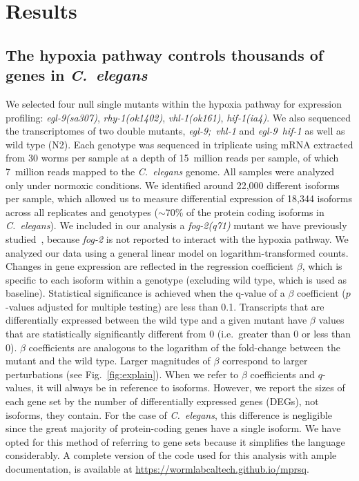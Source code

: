 \documentclass[9pt,twocolumn,twoside]{pnas-new}
\newcommand{\cel}{\emph{C.~elegans}}
\newcommand{\gene}[1]{\mbox{\emph{#1}}}
\begin{document}
\section*{Results}
\subsection*{The hypoxia pathway controls thousands of genes in \cel{}}
\label{sub:summary}

We selected four null single mutants within the hypoxia pathway for expression
profiling: \gene{egl-9(sa307)}, \gene{rhy-1(ok1402)}, \gene{vhl-1(ok161)},
\gene{hif-1(ia4)}. We also sequenced the transcriptomes of two double mutants,
\gene{egl-9; vhl-1} and \gene{egl-9 hif-1} as well as wild type (N2).
\color{purple}
Each genotype was sequenced in triplicate using mRNA extracted from 30 worms per
sample at a depth of 15~million reads per
sample, of which 7~million reads mapped to the \cel{} genome.
All samples were analyzed only under normoxic conditions.
\color{black}
We identified around
22,000 different isoforms per sample, which allowed us to measure differential
expression of 18,344 isoforms across all replicates and genotypes ($\sim$70\% of
the protein coding isoforms in \cel{}). We included in our analysis a
\gene{fog-2(q71)} mutant we have previously studied~\cite{Angeles-Albores2017a},
because \gene{fog-2} is not reported to interact with the hypoxia pathway. We
analyzed our data using a general linear model on logarithm-transformed counts.
Changes in gene expression are reflected in the regression coefficient $\beta$,
which is specific to each isoform within a genotype (excluding wild type, which
is used as baseline). Statistical significance is achieved when the q-value of a
$\beta$ coefficient ($p$-values adjusted for multiple testing) are less than 0.1.
Transcripts that are differentially expressed between the wild type and a
given mutant have $\beta$ values that are statistically significantly different
from 0 (i.e.\ greater than 0 or less than 0). $\beta$ coefficients are analogous
to the logarithm of the fold-change between the mutant and the wild type. Larger
magnitudes of $\beta$ correspond to larger perturbations (see
Fig.~\ref{fig:explain}). When we refer to $\beta$ coefficients and $q$-values,
it will always be in reference to isoforms. However, we report the sizes of each
gene set by the number of differentially expressed genes (DEGs), not
isoforms, they contain. For the case of \cel{}, this difference is negligible
since the great majority of protein-coding genes have a single isoform. We have
opted for this method of referring to gene sets because it simplifies the
language considerably. A complete version of the code used for this analysis
with ample documentation, is available at
\url{https://wormlabcaltech.github.io/mprsq}.
\end{document}
